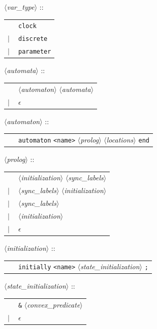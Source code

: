 \documentclass[a4paper,11pt]{report}
\newcommand{\emptystring}{$\epsilon$}
\newcommand{\nt}[1]{$\langle$\emph{#1}$\rangle$}
\newcommand{\regleGrammaire}[1]{\bigskip \noindent \nt{#1} :: \\}
\newcommand{\npec}[1]{\textcolor{green!50!black}{#1}}
\newcommand{\styleIMI}[1]{\textcolor{imicolor}{\texttt{#1}}}
\begin{document}
\regleGrammaire{var\_type}
\begin{tabular}{l l}
	\  & \styleIMI{clock} \\
	$|$ & \styleIMI{discrete} \\
	$|$ & \styleIMI{parameter} \\
\end{tabular}

\regleGrammaire{automata}
\begin{tabular}{l l}
	\  & \nt{automaton} \nt{automata} \\
	$|$ & \emptystring \\
\end{tabular}

\regleGrammaire{automaton}
\begin{tabular}{l l}
	\  & \styleIMI{automaton} \styleIMI{<name>} \nt{prolog} \nt{locations} \styleIMI{end} \\
\end{tabular}

\regleGrammaire{prolog}
\begin{tabular}{l l}
	\  & \npec{\nt{initialization}} \nt{sync\_labels} \\
	$|$ & \nt{sync\_labels} \npec{\nt{initialization}} \\
	$|$ & \nt{sync\_labels} \\
	$|$ & \npec{\nt{initialization}} \\
	$|$ & \emptystring \\
\end{tabular}

\regleGrammaire{\npec{initialization}}
\npec{
\begin{tabular}{l l}
	\  & \styleIMI{initially} \styleIMI{<name>} \nt{state\_initialization} \styleIMI{;} \\
\end{tabular}
}

\regleGrammaire{\npec{state\_initialization}}
\npec{
\begin{tabular}{l l}
	\  & \styleIMI{\&} \nt{convex\_predicate} \\
	$|$ & \emptystring \\
\end{tabular}
}
\end{document}
